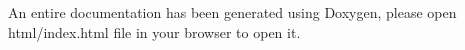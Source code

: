 An entire documentation has been generated using Doxygen, please open html/index.\+html file in your browser to open it. 